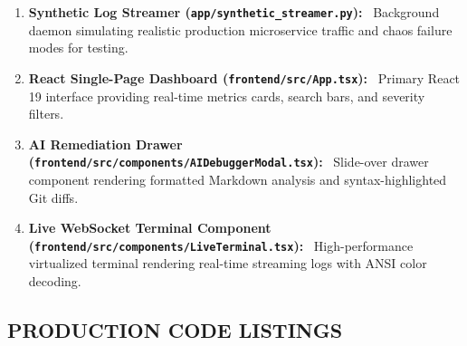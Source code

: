 \documentclass[12pt,a4paper]{article}
\newcommand{\lead}[1]{\textbf{#1}\ }
\begin{document}
\begin{enumerate}[leftmargin=1.5em,itemsep=4pt]
    \item \lead{Synthetic Log Streamer (\texttt{app/synthetic\_streamer.py}):} Background daemon simulating realistic production microservice traffic and chaos failure modes for testing.
    \item \lead{React Single-Page Dashboard (\texttt{frontend/src/App.tsx}):} Primary React 19 interface providing real-time metrics cards, search bars, and severity filters.
    \item \lead{AI Remediation Drawer (\texttt{frontend/src/components/AIDebuggerModal.tsx}):} Slide-over drawer component rendering formatted Markdown analysis and syntax-highlighted Git diffs.
    \item \lead{Live WebSocket Terminal Component (\texttt{frontend/src/components/LiveTerminal.tsx}):} High-performance virtualized terminal rendering real-time streaming logs with ANSI color decoding.
\end{enumerate}

\clearpage
\subsection{PRODUCTION CODE LISTINGS}\label{sec:sample_code}
\end{document}
